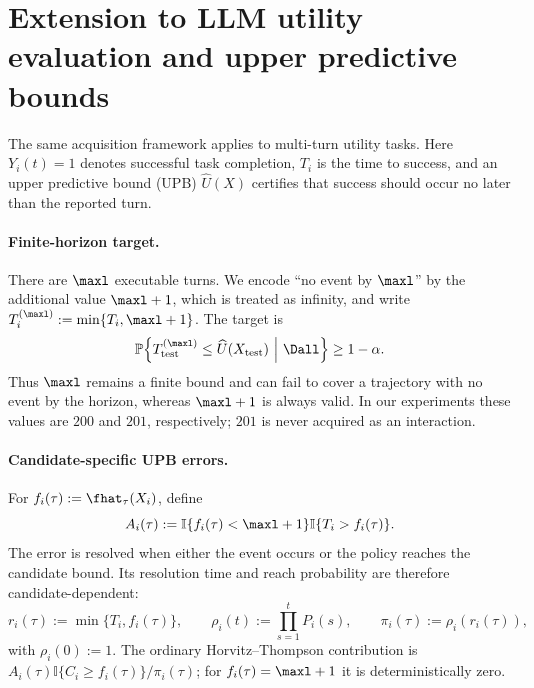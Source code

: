 
\section{Extension to LLM utility evaluation and upper predictive bounds}
\label{sec:utility_upb}

The same acquisition framework applies to multi-turn utility tasks. Here
\(Y_i(t)=1\) denotes successful task completion, \(T_i\) is the time to
success, and an upper predictive bound (UPB) \(\widehat U(X)\) certifies that
success should occur no later than the reported turn.

\paragraph{Finite-horizon target.}
There are \(\maxl\) executable turns. We encode ``no event by \(\maxl\)'' by
the additional value \(\maxl+1\), which is treated as infinity, and write
\(T_i^{(\maxl)}:=\min\{T_i,\maxl+1\}\). The target is
\begin{equation}
    \mathbb P\!\left\{
        T_{\rm test}^{(\maxl)}\leq\widehat U(X_{\rm test})
        \ \middle|\ \Dall
    \right\}\geq1-\alpha.
    \label{eq:upb_target}
\end{equation}
Thus \(\maxl\) remains a finite bound and can fail to cover a trajectory with
no event by the horizon, whereas \(\maxl+1\) is always valid. In our
experiments these values are \(200\) and \(201\), respectively; \(201\) is
never acquired as an interaction.

\paragraph{Candidate-specific UPB errors.}
For \(f_i(\tau):=\fhat_\tau(X_i)\), define
\begin{equation}
    A_i(\tau)
    :=\mathbb I\{f_i(\tau)<\maxl+1\}
      \mathbb I\{T_i>f_i(\tau)\}.
    \label{eq:upb_target_indicator}
\end{equation}
The error is resolved when either the event occurs or the policy reaches the
candidate bound. Its resolution time and reach probability are therefore
candidate-dependent:
\begin{equation}
    r_i(\tau):=\min\{T_i,f_i(\tau)\},
    \qquad
    \rho_i(t):=\prod_{s=1}^{t}P_i(s),
    \qquad
    \pi_i(\tau):=\rho_i(r_i(\tau)),
    \label{eq:upb_candidate_weight}
\end{equation}
with \(\rho_i(0):=1\). The ordinary Horvitz--Thompson contribution is
\(A_i(\tau)\mathbb I\{C_i\geq f_i(\tau)\}/\pi_i(\tau)\); for
\(f_i(\tau)=\maxl+1\) it is deterministically zero.

